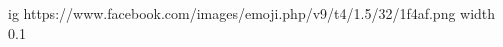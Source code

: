  
 
 
 
 
\ifcmt
  ig https://www.facebook.com/images/emoji.php/v9/t4/1.5/32/1f4af.png
  width 0.1
\fi
